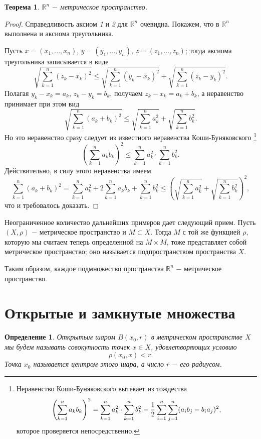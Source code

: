 \documentclass{article}
\newtheorem{theorem}{Теорема}[section]
\newtheorem{definition}{Определение}[section]
\begin{document}
\begin{theorem}
\(\mathbb{R}^n\) \(-\) метрическое пространство.
\end{theorem}

\begin{proof}
Справедливость аксиом \textit{1} и \textit{2} для \(\mathbb{R}^n\) очевидна. Покажем, что в \(\mathbb{R}^n\) выполнена и аксиома треугольника.

Пусть \(x = (x_1, ..., x_n)\), \(y = (y_1, ..., y_n)\), \(z = (z_1, ..., z_n)\); тогда аксиома треугольника записывается в виде
\[
\sqrt{\sum_{k = 1}^{n}(z_k - x_k)^2} \leq \sqrt{\sum_{k = 1}^{n}(y_k - x_k)^2} + \sqrt{\sum_{k = 1}^{n}(z_k - y_k)^2}.
\]
Полагая \(y_k - x_k = a_k\), \(z_k - y_k = b_k\), получаем \(z_k - x_k = a_k + b_k\), а неравенство принимает при этом вид
\[
\sqrt{\sum_{k = 1}^{n}(a_k + b_k)^2} \leq \sqrt{\sum_{k = 1}^{n}a_k^2} + \sqrt{\sum_{k = 1}^{n}b_k^2}.
\]
Но это неравенство сразу следует из известного неравенства Коши-Буняковского
\footnote{
Неравенство Коши-Буняковского вытекает из тождества
\[
\left(\sum_{k = 1}^{n}a_k{b_k}\right)^2 = \sum_{k = 1}^{n}a_k^2 \cdot \sum_{k = 1}^{n}b_k^2 - {1 \over 2}\sum_{i = 1}^{n}\sum_{j = 1}^{n}(a_ib_j - b_ia_j)^2,
\]
которое проверяется непосредственно.
}
\[
\left(\sum_{k = 1}^{n}a_k{b_k}\right)^2 \leq \sum_{k = 1}^{n}a_k^2 \cdot \sum_{k = 1}^{n}b_k^2.
\]
Действительно, в силу этого неравенства имеем
\[
\sum_{k = 1}^{n}(a_k + b_k)^2 = \sum_{k = 1}^{n}a_k^2 + 2 \sum_{k = 1}^{n}a_k{b_k} + \sum_{k = 1}^{n}b_k^2 \leq \left(\sqrt{\sum_{k = 1}^{n}a_k^2} + \sqrt{\sum_{k = 1}^{n}b_k^2}\right)^2,
\]
что и требовалось доказать.
\end{proof}

Неограниченное количество дальнейших примеров дает следующий прием. Пусть \((X, \rho)\) \(-\) метрическое пространство и \(M \subset X\). Тогда \(M\) с той же функцией \(\rho\), которую мы считаем теперь определенной на \(M \times M\), тоже представляет собой метрическое пространство; оно называется подпространством пространства \(X\).

Таким образом, каждое подмножество пространства \(\mathbb{R}^n\) \(-\) метрическое пространство.

\section{Открытые и замкнутые множества}

\begin{definition}
Открытым шаром \(B(x_0, r)\) в метрическом пространстве \(X\) мы будем называть совокупность точек \(x \in X\), удовлетворяющих условию
\[
\rho(x_0, x) < r.
\]
Точка \(x_0\) называется центром этого шара, а число \(r\) \(-\) его радиусом.
\end{definition}
\end{document}
